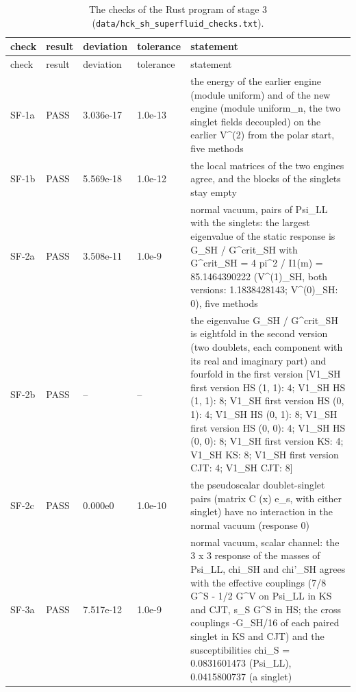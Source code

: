 \documentclass[aps,prd,onecolumn,superscriptaddress,nofootinbib,floatfix,longbibliography]{revtex4-2}
\begin{document}
\begingroup\fontsize{7}{8.5}\selectfont\setlength{\tabcolsep}{3pt}
\begin{longtable}{p{}p{}p{}p{}p{}}
\caption{\label{tab:checks_superfluid_rust}The checks of the Rust program of stage 3 (\texttt{data/hck\_sh\_superfluid\_checks.txt}).}\\
\hline\hline
check & result & deviation & tolerance & statement \\ \hline
\endfirsthead
\hline check & result & deviation & tolerance & statement \\ \hline
\endhead
\hline\hline
\endlastfoot
SF-1a & PASS & 3.036e-17 & 1.0e-13 & the energy of the earlier engine (module uniform) and of the new engine (module uniform\_n, the two singlet fields decoupled) on the earlier V\textasciicircum{}(2) from the polar start, five methods \\
SF-1b & PASS & 5.569e-18 & 1.0e-12 & the local matrices of the two engines agree, and the blocks of the singlets stay empty \\
SF-2a & PASS & 3.508e-11 & 1.0e-9 & normal vacuum, pairs of Psi\_LL with the singlets: the largest eigenvalue of the static response is G\_SH / G\textasciicircum{}crit\_SH with G\textasciicircum{}crit\_SH = 4 pi\textasciicircum{}2 / I1(m) = 85.1464390222 (V\textasciicircum{}(1)\_SH, both versions: 1.1838428143; V\textasciicircum{}(0)\_SH: 0), five methods \\
SF-2b & PASS & -- & -- & the eigenvalue G\_SH / G\textasciicircum{}crit\_SH is eightfold in the second version (two doublets, each component with its real and imaginary part) and fourfold in the first version [V1\_SH first version HS (1, 1): 4; V1\_SH HS (1, 1): 8; V1\_SH first version HS (0, 1): 4; V1\_SH HS (0, 1): 8; V1\_SH first version HS (0, 0): 4; V1\_SH HS (0, 0): 8; V1\_SH first version KS: 4; V1\_SH KS: 8; V1\_SH first version CJT: 4; V1\_SH CJT: 8] \\
SF-2c & PASS & 0.000e0 & 1.0e-10 & the pseudoscalar doublet-singlet pairs (matrix C (x) e\_s, with either singlet) have no interaction in the normal vacuum (response 0) \\
SF-3a & PASS & 7.517e-12 & 1.0e-9 & normal vacuum, scalar channel: the 3 x 3 response of the masses of Psi\_LL, chi\_SH and chi'\_SH agrees with the effective couplings (7/8 G\textasciicircum{}S - 1/2 G\textasciicircum{}V on Psi\_LL in KS and CJT, s\_S G\textasciicircum{}S in HS; the cross couplings -G\_SH/16 of each paired singlet in KS and CJT) and the susceptibilities chi\_S = 0.0831601473 (Psi\_LL), 0.0415800737 (a singlet) \\

\end{longtable}
\end{document}
